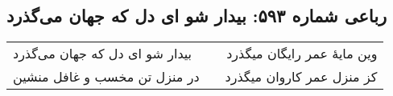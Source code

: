 \begin{center}
\section*{رباعی شماره ۵۹۳: بیدار شو ای دل که جهان می‌گذرد}
\label{sec:0593}
\begin{longtable}{l p{0.5cm} r}
بیدار شو ای دل که جهان می‌گذرد
&&
وین مایهٔ عمر رایگان میگذرد
\\
در منزل تن مخسب و غافل منشین
&&
کز منزل عمر کاروان میگذرد
\\
\end{longtable}
\end{center}

